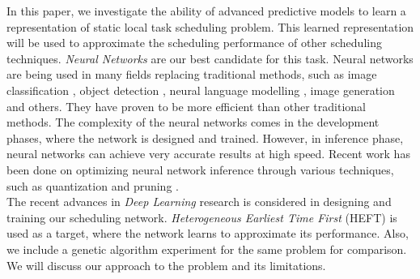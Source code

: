 In this paper, we investigate the ability of advanced predictive models to learn a representation of static local task scheduling problem. This learned representation will be used to approximate the scheduling performance of other scheduling techniques. \emph{Neural Networks} are our best candidate for this task. Neural networks are being used in many fields replacing traditional methods, such as image classification \cite{10.1145/3065386}, object detection \cite{ren2015faster}, neural language modelling \cite{ren2015faster}, image generation \cite{karras2019analyzing} and others. They have proven to be more efficient than other traditional methods. The complexity of the neural networks comes in the development phases, where the network is designed and trained. However, in inference phase, neural networks can achieve very accurate results at high speed. Recent work has been done on optimizing neural network inference through various techniques, such as quantization \cite{choukroun2019lowbit} and pruning \cite{yeom2019pruning}. \\

The recent advances in \emph{Deep Learning} research is considered in designing and training our scheduling network. \emph{Heterogeneous Earliest Time First} (HEFT) \cite{993206} is used as a target, where the network learns to approximate its performance. Also, we include a genetic algorithm experiment for the same problem for comparison. We will discuss our approach to the problem and its limitations.